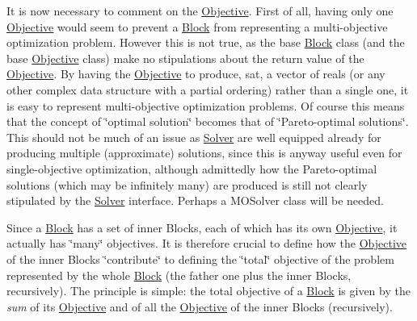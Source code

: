 It is now necessary to comment on the \mbox{\hyperlink{class_s_m_spp__di__unipi__it_1_1_objective}{Objective}}. First of all, having only one \mbox{\hyperlink{class_s_m_spp__di__unipi__it_1_1_objective}{Objective}} would seem to prevent a \mbox{\hyperlink{class_s_m_spp__di__unipi__it_1_1_block}{Block}} from representing a multi-\/objective optimization problem. However this is not true, as the base \mbox{\hyperlink{class_s_m_spp__di__unipi__it_1_1_block}{Block}} class (and the base \mbox{\hyperlink{class_s_m_spp__di__unipi__it_1_1_objective}{Objective}} class) make no stipulations about the return value of the \mbox{\hyperlink{class_s_m_spp__di__unipi__it_1_1_objective}{Objective}}. By having the \mbox{\hyperlink{class_s_m_spp__di__unipi__it_1_1_objective}{Objective}} to produce, sat, a vector of reals (or any other complex data structure with a partial ordering) rather than a single one, it is easy to represent multi-\/objective optimization problems. Of course this means that the concept of \char`\"{}optimal
solution\char`\"{} becomes that of \char`\"{}\+Pareto-\/optimal solutions\char`\"{}. This should not be much of an issue as \mbox{\hyperlink{class_s_m_spp__di__unipi__it_1_1_solver}{Solver}} are well equipped already for producing multiple (approximate) solutions, since this is anyway useful even for single-\/objective optimization, although admittedly how the Pareto-\/optimal solutions (which may be infinitely many) are produced is still not clearly stipulated by the \mbox{\hyperlink{class_s_m_spp__di__unipi__it_1_1_solver}{Solver}} interface. Perhaps a M\+O\+Solver class will be needed.

Since a \mbox{\hyperlink{class_s_m_spp__di__unipi__it_1_1_block}{Block}} has a set of inner Blocks, each of which has its own \mbox{\hyperlink{class_s_m_spp__di__unipi__it_1_1_objective}{Objective}}, it actually has \char`\"{}many\char`\"{} objectives. It is therefore crucial to define how the \mbox{\hyperlink{class_s_m_spp__di__unipi__it_1_1_objective}{Objective}} of the inner Blocks \char`\"{}contribute\char`\"{} to defining the \char`\"{}total\char`\"{} objective of the problem represented by the whole \mbox{\hyperlink{class_s_m_spp__di__unipi__it_1_1_block}{Block}} (the father one plus the inner Blocks, recursively). The principle is simple\+: the total objective of a \mbox{\hyperlink{class_s_m_spp__di__unipi__it_1_1_block}{Block}} is given by the {\itshape sum} of its \mbox{\hyperlink{class_s_m_spp__di__unipi__it_1_1_objective}{Objective}} and of all the \mbox{\hyperlink{class_s_m_spp__di__unipi__it_1_1_objective}{Objective}} of the inner Blocks (recursively).

